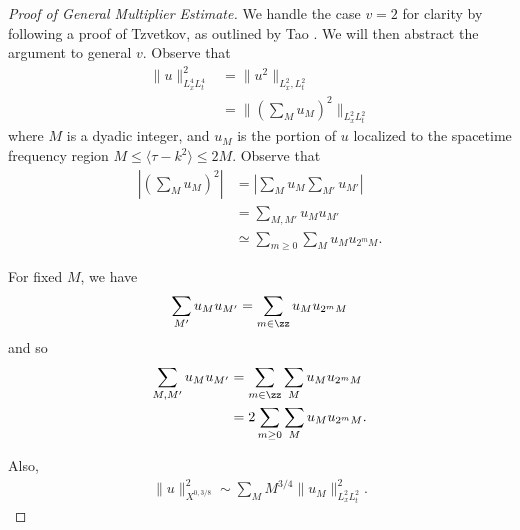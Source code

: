 \begin{proof}[Proof of General Multiplier Estimate]
  We handle the case $v = 2$ for clarity by following a proof of Tzvetkov, as outlined by Tao \cite{Tao-2006-Nonlinear-dispersive-equations}. We will then abstract the argument to general $v$. Observe that
  \begin{equation*}
  \begin{split}
    \| u \|_{L^{4}_{x}L^{4}_{t}}^{2} 
    &= \| u^{2} \|_{L^{2}_{x}, L^{2}_{t}}
    \\
    & = \| (\sum_{M}u_{M})^{2} \|_{L^{2}_{x}L^{2}_{t}}
  \end{split}
  \end{equation*}
  where $M$ is a dyadic integer, and $u_{M}$ is the portion of $u$ localized to the spacetime frequency region $M \le \langle \tau - k^{2} \rangle \le 2M$. Observe that
  \begin{equation*}
  \begin{split}
    | \left( \sum_{M} u_{M} \right)^{2} |
    & = | \sum_{M} u_{M} \sum_{M'}u_{M'} |
    \\
    & = \sum_{M, M'} u_{M} u_{M'}
    \\
    & \simeq \sum_{m \ge 0} \sum_{M} u_{M}u_{2^{m}M}.
  \end{split}
  \end{equation*}
  \begin{framed}
For fixed $M$, we have
  \begin{equation*}
  \begin{split}
    \sum_{M'} u_{M} u_{M'} = \sum_{m \in \zz} u_{M} u_{2^{m}M}
  \end{split}
  \end{equation*}
  and so
  \begin{equation*}
  \begin{split}
    \sum_{M, M'} u_{M}u_{M'}
    & = \sum_{m \in \zz} \sum_{M} u_{M} u_{2^{m}M}
    \\
    & = 2 \sum_{m \ge 0} \sum_{M} u_{M}u_{2^{m}M}.
  \end{split}
  \end{equation*}
\end{framed}
  Also,
  \begin{equation*}
  \begin{split}
    \| u \|^{2}_{X^{0, 3/8}} \sim \sum_{M} M^{3/4} \| u_{M} \|^{2}_{L^{2}_{x}L^{2}_{t}}.
  \end{split}
  \end{equation*}

\end{proof}

